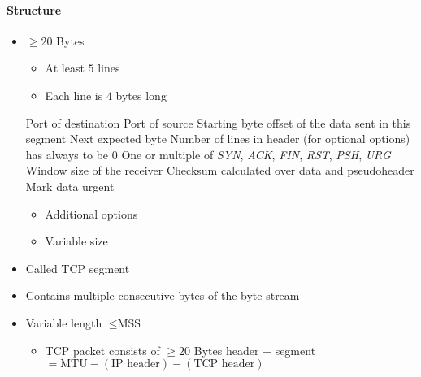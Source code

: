 \paragraph{Structure}
\begin{itemize}
        \begin{itemize}
            \item $\ge 20$ Bytes
                \begin{itemize}
                    \item At least $5$ lines
                    \item Each line is $4$ bytes long
                \end{itemize}
             Port of destination
             Port of source
             Starting byte offset of the data sent in this segment
             Next expected byte
             Number of lines in header (for optional options)
             has always to be $0$
             One or multiple of \textit{SYN}, \textit{ACK}, \textit{FIN}, \textit{RST}, \textit{PSH}, \textit{URG}
             Window size of the receiver
             Checksum calculated over data and pseudoheader
             Mark data urgent
                \begin{itemize}
                    \item Additional options
                    \item Variable size
                \end{itemize}
        \end{itemize}
        \begin{itemize}
            \item Called TCP segment
            \item Contains multiple consecutive bytes of the byte stream
            \item Variable length $\le \text{MSS}$
                \begin{itemize}
                     Maximal size of a IP packet
                    \item TCP packet consists of $\ge 20$ Bytes header $+$ segment
                         $= \text{MTU} - (\text{IP header}) - (\text{TCP header})$
                \end{itemize}

\end{itemize}
\end{itemize}
